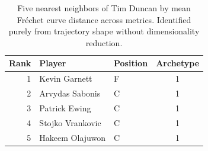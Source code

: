 \begin{table}[htbp]
  \centering\small
  \begin{tabular}{rllc}
    \toprule
    Rank & Player & Position & Archetype \\
    \midrule
    1 & Kevin Garnett & F & 1 \\
    2 & Arvydas Sabonis & C & 1 \\
    3 & Patrick Ewing & C & 1 \\
    4 & Stojko Vrankovic & C & 1 \\
    5 & Hakeem Olajuwon & C & 1 \\
    \bottomrule
  \end{tabular}
  \caption{Five nearest neighbors of Tim Duncan by mean Fr\'{e}chet curve distance across metrics. Identified purely from trajectory shape without dimensionality reduction.}
  \label{tab:Tim_Duncan_frechet_curve_neighbors}
\end{table}

